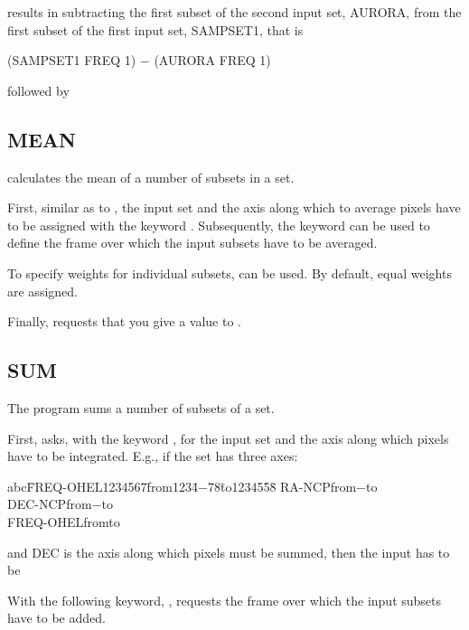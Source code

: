 results in subtracting the first subset of the second input set, AURORA,
from the first subset of the first input set, SAMPSET1, that is

(SAMPSET1 FREQ 1) $-$ (AURORA FREQ 1)

followed by


\subsection*{MEAN}

 calculates the mean of a number of subsets in a set. 

First, similar as to , the input set and the axis along
which to average pixels have to be assigned with the keyword
.  Subsequently, the keyword  can be used
to define the frame over which the input subsets have to be averaged. 

To specify weights for individual subsets,  can be
used.  By default, equal weights are assigned. 

Finally,  requests that you give a value to . 

\subsection*{SUM}

The program  sums a number of subsets of a set.

First,  asks, with the keyword , for the
input set and the axis along which pixels have to be integrated.  E.g.,
if the set  has three axes:

\begin{tabbing}
abc\=FREQ-OHEL1234567\=from1234\=$-$\=78\=to12345\=5\=8\+\kill
RA-NCP\>from\>$-$\>to\>\\
DEC-NCP\>from\>$-$\>to\>\\
FREQ-OHEL\>from\>\>to
\end{tabbing}
and DEC is the axis along which pixels must be summed, then the input has to be



With the following keyword, ,  requests the
frame over which the input subsets have to be added. 

